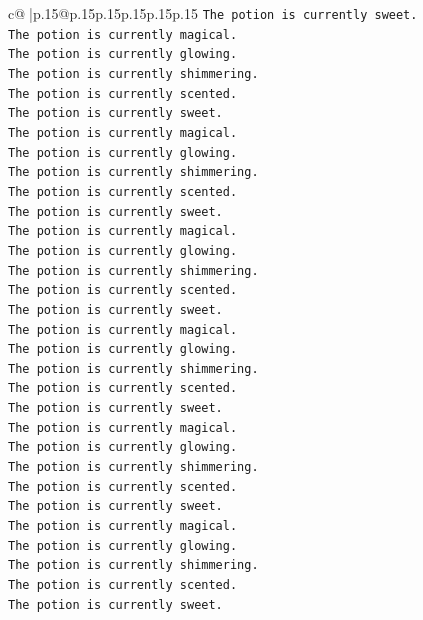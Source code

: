 \documentclass{article}
\begin{document}
{\begin{supertabular}{c@{$\;$}|p{.15\linewidth}@{}p{.15\linewidth}p{.15\linewidth}p{.15\linewidth}p{.15\linewidth}p{.15\linewidth}}
{{{\texttt{The potion is currently sweet.} \\
\texttt{The potion is currently magical.} \\
\texttt{The potion is currently glowing.} \\
\texttt{The potion is currently shimmering.} \\
\texttt{The potion is currently scented.} \\
\texttt{The potion is currently sweet.} \\
\texttt{The potion is currently magical.} \\
\texttt{The potion is currently glowing.} \\
\texttt{The potion is currently shimmering.} \\
\texttt{The potion is currently scented.} \\
\texttt{The potion is currently sweet.} \\
\texttt{The potion is currently magical.} \\
\texttt{The potion is currently glowing.} \\
\texttt{The potion is currently shimmering.} \\
\texttt{The potion is currently scented.} \\
\texttt{The potion is currently sweet.} \\
\texttt{The potion is currently magical.} \\
\texttt{The potion is currently glowing.} \\
\texttt{The potion is currently shimmering.} \\
\texttt{The potion is currently scented.} \\
\texttt{The potion is currently sweet.} \\
\texttt{The potion is currently magical.} \\
\texttt{The potion is currently glowing.} \\
\texttt{The potion is currently shimmering.} \\
\texttt{The potion is currently scented.} \\
\texttt{The potion is currently sweet.} \\
\texttt{The potion is currently magical.} \\
\texttt{The potion is currently glowing.} \\
\texttt{The potion is currently shimmering.} \\
\texttt{The potion is currently scented.} \\
\texttt{The potion is currently sweet.} \\
}}}
\end{supertabular}}
\end{document}
